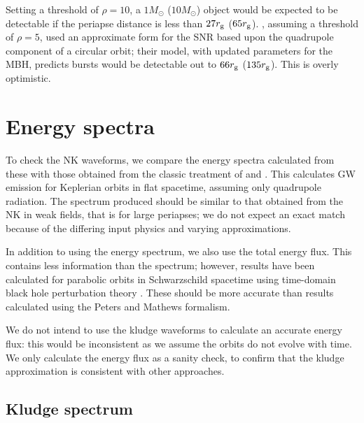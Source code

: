 Setting a threshold of $\rho = 10$, a $1 M_\odot$ ($10 M_\odot$) object would be expected to be detectable if the periapse distance is less than $27 r_\mathrm{g}$ ($65 r_\mathrm{g}$). \citet{Hopman2007}, assuming a threshold of $\rho = 5$, used an approximate form for the SNR based upon the quadrupole component of a circular orbit; their model, with updated parameters for the MBH, predicts bursts would be detectable out to $66 r_\mathrm{g}$ ($135 r_\mathrm{g}$). This is overly optimistic.

\section{Energy spectra}\label{sec:Energy}

To check the NK waveforms, we compare the energy spectra calculated from these with those obtained from the classic treatment of \citet{Peters1963} and \citet{Peters1964}. This calculates GW emission for Keplerian orbits in flat spacetime, assuming only quadrupole radiation. The spectrum produced should be similar to that obtained from the NK in weak fields, that is for large periapses; we do not expect an exact match because of the differing input physics and varying approximations.

In addition to using the energy spectrum, we also use the total energy flux. This contains less information than the spectrum; however, results have been calculated for parabolic orbits in Schwarzschild spacetime using time-domain black hole perturbation theory \citep{Martel2004}. These should be more accurate than results calculated using the Peters and Mathews formalism.

We do not intend to use the kludge waveforms to calculate an accurate energy flux: this would be inconsistent as we assume the orbits do not evolve with time. We only calculate the energy flux as a sanity check, to confirm that the kludge approximation is consistent with other approaches.

\subsection{Kludge spectrum}

